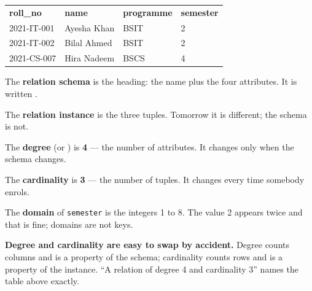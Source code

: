 \begin{examplebox}

\medskip
\begin{tabular}{@{}L{3.2cm}L{3.0cm}L{2.4cm}L{2.2cm}@{}}
\textbf{roll\_no} & \textbf{name} & \textbf{programme} & \textbf{semester} \\
2021-IT-001 & Ayesha Khan & BSIT & 2 \\
2021-IT-002 & Bilal Ahmed & BSIT & 2 \\
2021-CS-007 & Hira Nadeem & BSCS & 4 \\
\end{tabular}

\medskip
\begin{tight}
  \item The \textbf{relation schema} is the heading: the name plus the four
        attributes. It is written .
  \item The \textbf{relation instance} is the three tuples. Tomorrow it is
        different; the schema is not.
  \item The \textbf{degree} (or ) is \textbf{4} --- the number of
        attributes. It changes only when the schema changes.
  \item The \textbf{cardinality} is \textbf{3} --- the number of tuples. It
        changes every time somebody enrols.
  \item The \textbf{domain} of \texttt{semester} is the integers 1 to 8. The
        value 2 appears twice and that is fine; domains are not keys.
\end{tight}

\smallskip
\textbf{Degree and cardinality are easy to swap by accident.} Degree counts
columns and is a property of the schema; cardinality counts rows and is a
property of the instance. ``A relation of degree 4 and cardinality 3'' names
the table above exactly.
\end{examplebox}

